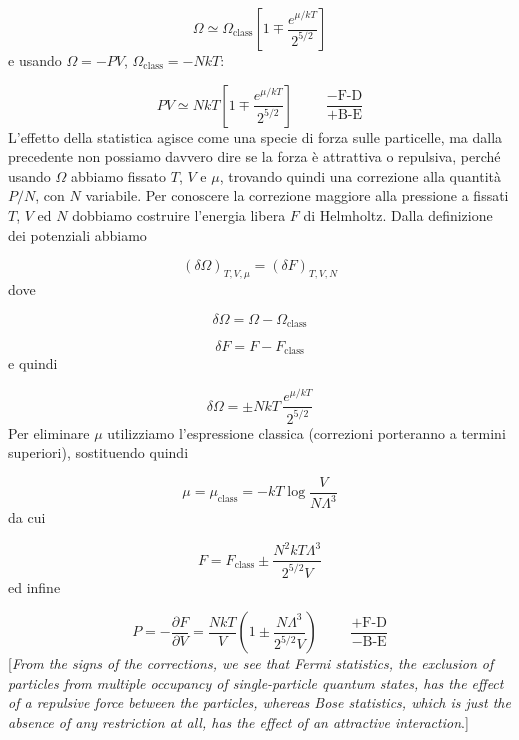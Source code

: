 \documentclass[a4paper]{report}
\begin{document}
\begin{equation}
    \Omega \simeq \Omega_{\text{class}}\left[1\mp \frac{e^{\mu/k T}}{2^{5/2}}\right]
\end{equation}
e usando $\Omega = -P V$, $\Omega_{\text{class}} = - N k T$:

\begin{equation}
     P V \simeq N k T \left[1\mp \frac{e^{\mu/k T}}{2^{5/2}}\right]\qquad \,\,\frac{-\text{F-D}}{+\text{B-E}}
\end{equation}
L'effetto della statistica agisce come una specie di forza sulle particelle, ma dalla precedente non possiamo davvero dire se la forza è attrattiva o repulsiva, perché usando $\Omega$ abbiamo fissato $T$, $V$ e $\mu$, trovando quindi una correzione alla quantità $P/N$, con $N$ variabile. Per conoscere la correzione maggiore alla pressione a fissati $T$, $V$ ed $N$ dobbiamo costruire l'energia libera $F$ di Helmholtz. Dalla definizione dei potenziali abbiamo

\begin{equation}
    (\delta \Omega)_{T,V,\mu} = (\delta F)_{T,V,N}
\end{equation}
dove

\begin{equation}
    \delta \Omega = \Omega - \Omega_{\text{class}}
\end{equation}

\begin{equation}
    \delta F = F - F_{\text{class}}
\end{equation}
e quindi 

\begin{equation}
    \delta \Omega = \pm N k T \,\frac{e^{\mu/k T}}{2^{5/2}}
\end{equation}
Per eliminare $\mu$ utilizziamo l'espressione classica (correzioni porteranno a termini superiori), sostituendo quindi

\begin{equation}
    \mu = \mu_{\text{class}} = - k T \log \frac{V}{N\Lambda^3}
\end{equation}
da cui

\begin{equation}
    F = F_{\text{class}} \pm \frac{N^2 k T \Lambda^3}{2^{5/2} V}
\end{equation}
ed infine

\begin{equation}
    P = -\frac{\partial F}{\partial V} = \frac{N k T}{V} \left(1 \pm \frac{N \Lambda^3}{2^{5/2}V}\right)\qquad \,\,\frac{+\text{F-D}}{-\text{B-E}}
\end{equation}
[\textit{From the signs of the corrections, we see that Fermi statistics, the exclusion of particles from multiple occupancy of single-particle quantum states, has the effect of a repulsive force between the particles, whereas Bose statistics, which is just the absence of any restriction at all, has the effect of an attractive interaction}.]
\end{document}
